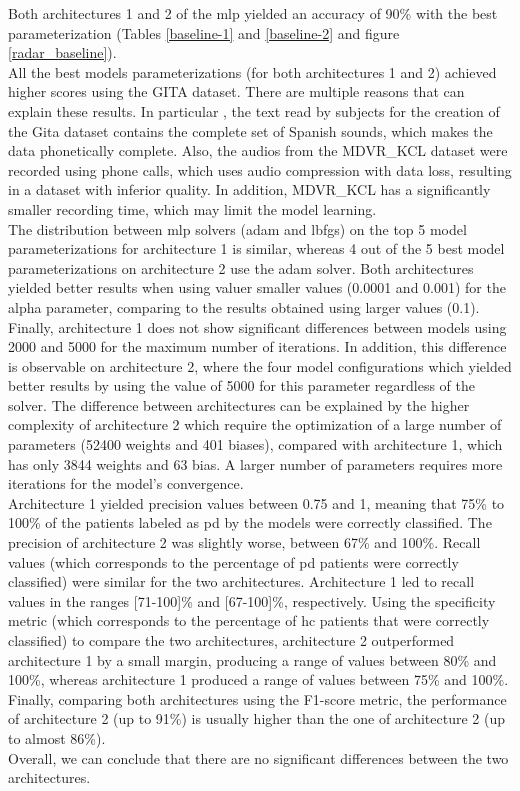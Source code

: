 Both architectures 1 and 2 of the \gls{mlp} yielded an accuracy of 90\% with the best parameterization (Tables \ref{baseline-1} and \ref{baseline-2} and figure \ref{radar_baseline}). \\
All the best models parameterizations (for both architectures 1 and 2) achieved higher scores using the GITA dataset. There are multiple reasons that can explain these results. In particular , the text read by subjects for the creation of the Gita dataset contains the complete set of Spanish sounds, which makes the data phonetically complete. Also, the audios from the MDVR\_KCL dataset were recorded using phone calls, which uses audio compression with data loss, resulting in a dataset with inferior quality. In addition, MDVR\_KCL has a significantly smaller recording time, which may limit the model learning. \\
The distribution between \gls{mlp} solvers (adam and lbfgs) on the top 5 model parameterizations for architecture 1 is similar, whereas 4 out of the 5 best model parameterizations on architecture 2 use the adam solver. Both architectures yielded better results when using valuer smaller values (0.0001 and 0.001) for the alpha parameter, comparing to the results obtained using larger values (0.1). Finally, architecture 1 does not show significant differences between models using 2000 and 5000 for the maximum number of iterations. In addition, this difference is observable on architecture 2, where the four model configurations which yielded better results by using the value of 5000 for this parameter regardless of the solver. The difference between architectures can be explained by the higher complexity of architecture 2 which require the optimization of a large number of parameters (52400 weights and 401 biases), compared with architecture 1, which has only 3844 weights and 63 bias. A larger number of parameters requires more iterations for the model's convergence. \\
Architecture 1 yielded precision values between 0.75 and 1, meaning that 75\% to 100\% of the patients labeled as \gls{pd} by the models were correctly classified. The precision of architecture 2 was slightly worse, between 67\% and 100\%. Recall values (which corresponds to the percentage of \gls{pd} patients were correctly classified) were similar for the two architectures. Architecture 1 led to recall values in the ranges [71-100]\% and [67-100]\%, respectively. Using the specificity metric (which corresponds to the percentage of \gls{hc} patients that were correctly classified) to compare the two architectures, architecture 2 outperformed architecture 1 by a small margin, producing a range of values between 80\% and 100\%, whereas architecture 1 produced a range of values between 75\% and 100\%. Finally, comparing both architectures using the F1-score metric, the performance of architecture 2 (up to 91\%) is usually higher than the one of architecture 2 (up to almost 86\%). \\
Overall, we can conclude that there are no significant differences between the two architectures.

